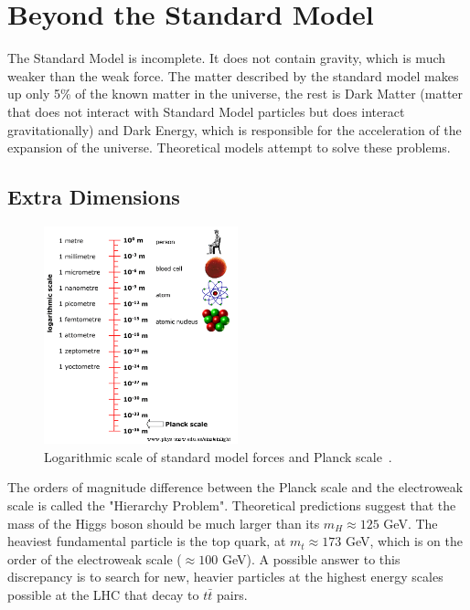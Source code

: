\section{Beyond the Standard Model}


The Standard Model is incomplete. It does not contain gravity, which is much weaker than the weak force. The matter described by the standard model makes up only 5\% of the known matter in the universe, the rest is Dark Matter (matter that does not interact with Standard Model particles but does interact gravitationally) and Dark Energy, which is responsible for the acceleration of the expansion of the universe. Theoretical models attempt to solve these problems. 


\subsection*{Extra Dimensions}


\begin{figure}[h!]
	\centering
	\includegraphics[width=0.5\textwidth]{figures/Planck_scale.png}
	\caption{Logarithmic scale of standard model forces and Planck scale~\cite{Planck_scale}.}
	\label{fig:planck}
\end{figure}


The orders of magnitude difference between the Planck scale and the electroweak scale is called the "Hierarchy Problem". Theoretical predictions suggest that the mass of the Higgs boson should be much larger than its $m_H \approx 125$ GeV. The heaviest fundamental particle is the top quark, at $m_t \approx 173$ GeV, which is on the order of the electroweak scale ($\approx 100$ GeV). A possible answer to this discrepancy is to search for new, heavier particles at the highest energy scales possible at the LHC that decay to $t\bar{t}$ pairs. 

